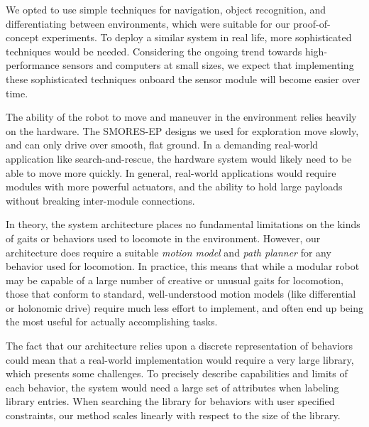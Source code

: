 \documentclass[12pt]{article}
\begin{document}
We opted to use simple techniques for navigation, object recognition, and differentiating between environments, which were suitable for our proof-of-concept experiments. To deploy a similar system in real life, more sophisticated techniques would be needed. Considering the ongoing trend towards high-performance sensors and computers at small sizes, we expect that implementing these sophisticated techniques onboard the sensor module will become easier over time.

The ability of the robot to move and maneuver in the environment relies heavily on the hardware.  The SMORES-EP designs we used for exploration move slowly, and can only drive over smooth, flat ground.  In a demanding real-world application like search-and-rescue, the hardware system would likely need to be able to move more quickly.  In general, real-world applications would require modules with more powerful actuators, and the ability to hold large payloads without breaking inter-module connections.

In theory, the system architecture places no fundamental limitations on the kinds of gaits or behaviors used to locomote in the environment.  However, our architecture does require a suitable \textit{motion model} and \textit{path planner} for any behavior used for locomotion.  In practice, this means that while a modular robot may be capable of a large number of creative or unusual gaits for locomotion, those that conform to standard, well-understood motion models (like differential or holonomic drive) require much less effort to implement, and often end up being the most useful for actually accomplishing tasks.

The fact that our architecture relies upon a discrete representation of behaviors could mean that a real-world implementation would require a very large library, which presents some challenges. To precisely describe capabilities and limits of each behavior, the system would need a large set of attributes when labeling library entries. 
When searching the library for behaviors with user specified constraints, our method scales linearly with respect to the size of the library.%
\end{document}
